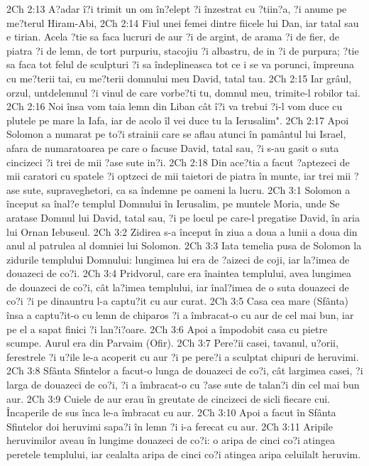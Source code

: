 2Ch 2:13  A?adar î?i trimit un om în?elept ?i înzestrat cu ?tiin?a, ?i anume pe me?terul Hiram-Abi,
2Ch 2:14  Fiul unei femei dintre fiicele lui Dan, iar tatal sau e tirian. Acela ?tie sa faca lucruri de aur ?i de argint, de arama ?i de fier, de piatra ?i de lemn, de tort purpuriu, stacojiu ?i albastru, de in ?i de purpura; ?tie sa faca tot felul de sculpturi ?i sa îndeplineasca tot ce i se va porunci, împreuna cu me?terii tai, cu me?terii domnului meu David, tatal tau.
2Ch 2:15  Iar grâul, orzul, untdelemnul ?i vinul de care vorbe?ti tu, domnul meu, trimite-l robilor tai.
2Ch 2:16  Noi însa vom taia lemn din Liban cât î?i va trebui ?i-l vom duce cu plutele pe mare la Iafa, iar de acolo îl vei duce tu la Ierusalim".
2Ch 2:17  Apoi Solomon a numarat pe to?i strainii care se aflau atunci în pamântul lui Israel, afara de numaratoarea pe care o facuse David, tatal sau, ?i s-au gasit o suta cincizeci ?i trei de mii ?ase sute in?i.
2Ch 2:18  Din ace?tia a facut ?aptezeci de mii caratori cu spatele ?i optzeci de mii taietori de piatra în munte, iar trei mii ?ase sute, supraveghetori, ca sa îndemne pe oameni la lucru.
2Ch 3:1  Solomon a început sa înal?e templul Domnului în Ierusalim, pe muntele Moria, unde Se aratase Domnul lui David, tatal sau, ?i pe locul pe care-l pregatise David, în aria lui Ornan Iebuseul.
2Ch 3:2  Zidirea s-a început în ziua a doua a lunii a doua din anul al patrulea al domniei lui Solomon.
2Ch 3:3  Iata temelia pusa de Solomon la zidurile templului Domnului: lungimea lui era de ?aizeci de coji, iar la?imea de douazeci de co?i.
2Ch 3:4  Pridvorul, care era înaintea templului, avea lungimea de douazeci de co?i, cât la?imea templului, iar înal?imea de o suta douazeci de co?i ?i pe dinauntru l-a captu?it cu aur curat.
2Ch 3:5  Casa cea mare (Sfânta) însa a captu?it-o cu lemn de chiparos ?i a îmbracat-o cu aur de cel mai bun, iar pe el a sapat finici ?i lan?i?oare.
2Ch 3:6  Apoi a împodobit casa cu pietre scumpe. Aurul era din Parvaim (Ofir).
2Ch 3:7  Pere?ii casei, tavanul, u?orii, ferestrele ?i u?ile le-a acoperit cu aur ?i pe pere?i a sculptat chipuri de heruvimi.
2Ch 3:8  Sfânta Sfintelor a facut-o lunga de douazeci de co?i, cât largimea casei, ?i larga de douazeci de co?i, ?i a îmbracat-o cu ?ase sute de talan?i din cel mai bun aur.
2Ch 3:9  Cuiele de aur erau în greutate de cincizeci de sicli fiecare cui. Încaperile de sus înca le-a îmbracat cu aur.
2Ch 3:10  Apoi a facut în Sfânta Sfintelor doi heruvimi sapa?i în lemn ?i i-a ferecat cu aur.
2Ch 3:11  Aripile heruvimilor aveau în lungime douazeci de co?i: o aripa de cinci co?i atingea peretele templului, iar cealalta aripa de cinci co?i atingea aripa celuilalt heruvim.
